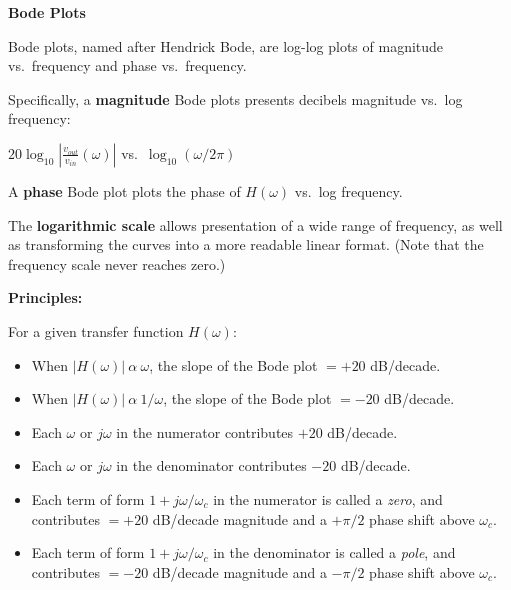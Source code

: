
%




\setcounter{page}{1}
\setcounter{equation}{0}
\setcounter{figure}{0}
\begin{center}
\Large{\textbf{Bode Plots}}
\normalsize
\end{center}


Bode plots, named after Hendrick Bode, are log-log plots of magnitude vs.\ frequency and phase
vs.\ frequency. 

Specifically, a \textbf{magnitude} Bode plots presents
decibels magnitude vs.\ log frequency:

$20 \log_{10} |\frac{v_{out}}{v_{in}}(\omega)|$ vs.\
$\log_{10}(\omega / 2 \pi)$

A \textbf{phase} Bode plot plots the phase of $H(\omega)$ vs.\ log frequency.

The \textbf{logarithmic scale} allows presentation of a wide range of
frequency, as well as transforming the curves into a more readable
linear format. (Note that the frequency scale never reaches zero.)

\textbf{Principles:}

For a given transfer function $H(\omega)$:
\begin{itemize}
\item When $|H(\omega)|~\alpha~\omega$, the slope of the Bode plot $= +20$
dB/decade.
\item When $|H(\omega)|~\alpha~1/\omega$, the slope of the Bode plot $= -20$
dB/decade.

\item Each $\omega$ or $j\omega$ in the numerator contributes $+20$
dB/decade.
\item Each $\omega$ or $j\omega$ in the denominator contributes $-20$
dB/decade.

\item Each term of form $1 + j \omega / \omega_c$ in the numerator is called
a \textit{zero}, and contributes $= +20$
dB/decade magnitude and a $+\pi/2$ phase shift above $\omega_c$.

\item Each term of form $1 + j \omega / \omega_c$ in the denominator is called
a \textit{pole}, and contributes $= -20$
dB/decade magnitude and a $-\pi/2$ phase shift above $\omega_c$.
\end{itemize}

